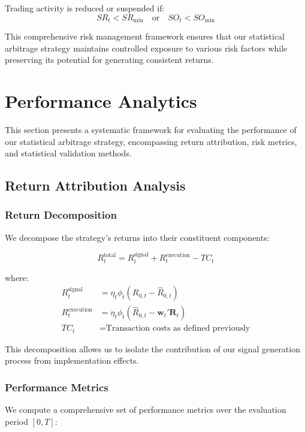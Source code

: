Trading activity is reduced or suspended if:
\begin{equation}
    SR_t < SR_{\text{min}} \quad \text{or} \quad SO_t < SO_{\text{min}}
\end{equation}

This comprehensive risk management framework ensures that our statistical arbitrage strategy maintains controlled exposure to various risk factors while preserving its potential for generating consistent returns.



\section{Performance Analytics}

This section presents a systematic framework for evaluating the performance of our statistical arbitrage strategy, encompassing return attribution, risk metrics, and statistical validation methods.

\subsection{Return Attribution Analysis}

\subsubsection{Return Decomposition}
We decompose the strategy's returns into their constituent components:

\begin{equation}
    R_t^{\text{total}} = R_t^{\text{signal}} + R_t^{\text{execution}} - TC_t
\end{equation}

where:
\begin{equation}
\begin{aligned}
    R_t^{\text{signal}} &= \eta_t\phi_t(R_{0,t} - \hat{R}_{0,t}) \\
    R_t^{\text{execution}} &= \eta_t\phi_t(\hat{R}_{0,t} - \mathbf{w}_t'\mathbf{R}_t) \\
    TC_t &= \text{Transaction costs as defined previously}
\end{aligned}
\end{equation}

This decomposition allows us to isolate the contribution of our signal generation process from implementation effects.

\subsubsection{Performance Metrics}
We compute a comprehensive set of performance metrics over the evaluation period $[0,T]$:

